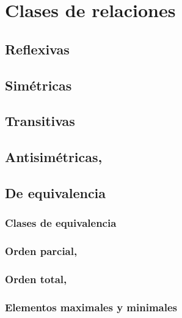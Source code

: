 \section{Clases de relaciones}

\subsection{Reflexivas}

\subsection{Simétricas}

\subsection{Transitivas}

\subsection{Antisimétricas, }

\subsection{De equivalencia }

\subsubsection{Clases de equivalencia }

\subsubsection{Orden parcial, }

\subsubsection{Orden total, }

\subsubsection{Elementos maximales y minimales }
